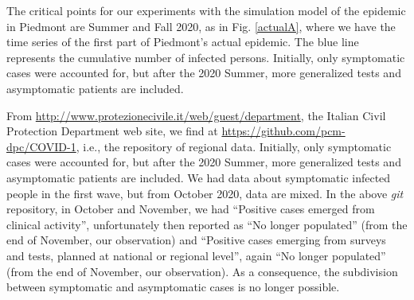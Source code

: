 \documentclass[graybox]{svmult}
\begin{document}
The critical points for our experiments with the simulation model of the epidemic in Piedmont are Summer and Fall 2020, as in Fig. \ref{actualA}, where we have the time series of the first part of Piedmont's actual epidemic. The blue line represents the cumulative number of infected persons. Initially, only symptomatic cases were accounted for, but after the 2020 Summer, more generalized tests and asymptomatic patients are included. 

From \href{http://www.protezionecivile.it/web/guest/department}{http://www.protezionecivile.it/web/guest/department}, the Italian Civil Protection Department web site, we find at \href{https://github.com/pcm-dpc/COVID-19}{https://github.com/pcm-dpc/COVID-1}, i.e., the repository of regional data. Initially, only symptomatic cases were accounted for, but after the 2020 Summer, more generalized tests and asymptomatic patients are included. We had data about symptomatic infected people in the first wave, but from October 2020, data are mixed. In the above \emph{git} repository, in October and November, we had ``Positive cases emerged from clinical activity'', unfortunately then reported as ``No longer populated'' (from the end of November, our observation) and ``Positive cases emerging from surveys and tests, planned at national or regional level'', again ``No longer populated'' (from the end of November, our observation). As a consequence, the subdivision between symptomatic and asymptomatic cases is no longer possible.
\end{document}
